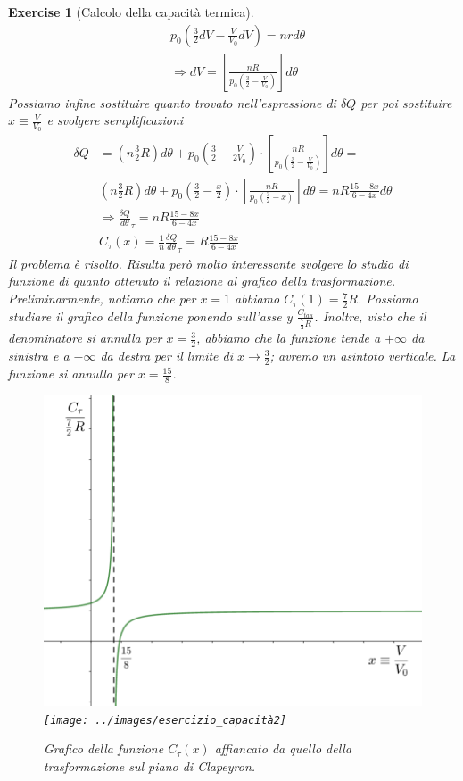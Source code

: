 \documentclass[10pt,a4paper]{article}
\newtheorem{exercise}{Exercise}
\begin{document}
\begin{exercise}[Calcolo della capacità termica]
\begin{align*}
	&p_0\left(\frac{3}{2}dV - \frac{V}{V_0}dV\right) = n r d\theta\\
	&\Rightarrow dV = \left[\frac{n R}{p_0 \left(\frac{3}{2}-\frac{V}{V_0}\right)}\right]d\theta
\end{align*}
Possiamo infine sostituire quanto trovato nell'espressione di $\delta Q$ per poi sostituire \(x \equiv \frac{V}{V_0}\) e svolgere semplificazioni
\begin{align*}
	\delta Q &= \left(n \frac{3}{2} R\right) d\theta + p_0 \left(\frac{3}{2} - \frac{V}{2 V_0}\right) \cdot \left[\frac{n R}{p_0 \left(\frac{3}{2}-\frac{V}{V_0}\right)}\right]d\theta =\\
	&\left(n \frac{3}{2} R\right) d\theta + p_0 \left(\frac{3}{2} - \frac{x}{2}\right) \cdot \left[\frac{n R}{p_0 \left(\frac{3}{2}- x \right)}\right]d\theta= n R \frac{15-8x}{6-4x}d\theta\\
	&\Rightarrow \frac{\delta Q}{d\theta}_{\tau} = n R \frac{15-8x}{6-4x}\\
	&C_{\tau}(x) = \frac{1}{n}\frac{\delta Q}{d\theta}_{\tau} = R \frac{15-8x}{6-4x}
\end{align*}
Il problema è risolto. Risulta però molto interessante svolgere lo studio di funzione di quanto ottenuto il relazione al grafico della trasformazione. \\
Preliminarmente, notiamo che per \(x = 1\) abbiamo \(C_{\tau}(1) = \frac{7}{2}R\). Possiamo studiare il grafico della funzione ponendo sull'asse y \(\frac{C_{tau}}{\frac{7}{2}R}\). Inoltre, visto che il denominatore si annulla per \(x = \frac{3}{2}\), abbiamo che la funzione tende a \(+\infty \) da sinistra e a  \(-\infty\) da destra per il limite di $x \to \frac{3}{2}$; avremo un asintoto verticale. La funzione si annulla per $x = \frac{15}{8}$.

\begin{figure}[h!]
	\centering
	\includegraphics[width=0.45\linewidth]{../images/studio_di_funz}\quad
	\texttt{[image: ../images/esercizio\_capacità2]}
	\caption{Grafico della funzione $C_{\tau}(x)$ affiancato da quello della trasformazione sul piano di Clapeyron.}
	\label{fig:studiodifunz}
\end{figure}
\FloatBarrier


\end{exercise}
\end{document}
